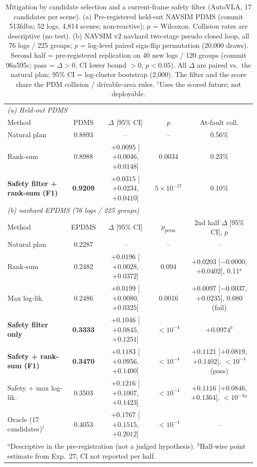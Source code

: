\begin{table}[t]
\centering
\small
\setlength{\tabcolsep}{3pt}
\caption{Mitigation by candidate selection and a current-frame safety filter (AutoVLA, 17 candidates per scene). (a) Pre-registered held-out NAVSIM PDMS (commit 513fdba; 52 logs, 4{,}814 scenes; non-reactive); $p$ = Wilcoxon. Collision rates are descriptive (no test). (b) NAVSIM v2 navhard two-stage pseudo closed loop, all 76 logs / 225 groups; $p$ = log-level paired sign-flip permutation (20{,}000 draws). Second half = pre-registered replication on 40 new logs / 120 groups (commit 96a595c; pass = $\Delta>0$, CI lower bound $>0$, $p<0.05$). All $\Delta$ are paired vs.\ the natural plan; 95\% CI = log-cluster bootstrap (2{,}000). The filter and the score share the PDM collision / drivable-area rules. $^\dagger$Uses the scored future; not deployable.}
\label{tab:mitigation}
\begin{tabular}{lcccc}
\toprule
\multicolumn{5}{l}{\textit{(a) Held-out PDMS}} \\
Method & PDMS & $\Delta$ [95\% CI] & $p$ & At-fault coll. \\
\midrule
Natural plan & 0.8893 & -- & -- & 0.56\% \\
Rank-sum & 0.8988 & $+0.0095$ [$+0.0046$, $+0.0148$] & 0.0034 & 0.23\% \\
\textbf{Safety filter + rank-sum (F1)} & \textbf{0.9209} & $\mathbf{+0.0315}$ [$+0.0234$, $+0.0410$] & $5\times10^{-17}$ & 0.10\% \\
\midrule
\multicolumn{5}{l}{\textit{(b) navhard EPDMS (76 logs / 225 groups)}} \\
Method & EPDMS & $\Delta$ [95\% CI] & $p_\text{perm}$ & 2nd half $\Delta$ [95\% CI], $p$ \\
\midrule
Natural plan & 0.2287 & -- & -- & -- \\
Rank-sum & 0.2482 & $+0.0196$ [$+0.0028$, $+0.0372$] & 0.094 & $+0.0203$ [$-0.0000$, $+0.0402$], 0.11$^{a}$ \\
Max log-lik. & 0.2486 & $+0.0199$ [$+0.0080$, $+0.0325$] & 0.0016 & $+0.0097$ [$-0.0037$, $+0.0235$], 0.080 (fail) \\
\textbf{Safety filter only} & \textbf{0.3333} & $\mathbf{+0.1046}$ [$+0.0845$, $+0.1251$] & $<10^{-4}$ & $+0.0974$$^{b}$ \\
\textbf{Safety + rank-sum (F1)} & \textbf{0.3470} & $\mathbf{+0.1183}$ [$+0.0956$, $+0.1400$] & $<10^{-4}$ & $+0.1121$ [$+0.0819$, $+0.1402$], $<10^{-4}$ (pass) \\
Safety + max log-lik. & 0.3503 & $+0.1216$ [$+0.1007$, $+0.1423$] & $<10^{-4}$ & $+0.1116$ [$+0.0846$, $+0.1364$], $<10^{-4}$$^{a}$ \\
Oracle (17 candidates)$^\dagger$ & 0.4053 & $+0.1767$ [$+0.1515$, $+0.2012$] & $<10^{-4}$ & -- \\
\bottomrule
\multicolumn{5}{l}{\footnotesize $^{a}$Descriptive in the pre-registration (not a judged hypothesis). $^{b}$Half-wise point estimate from Exp.~27; CI not reported per half.}
\end{tabular}
\end{table}
